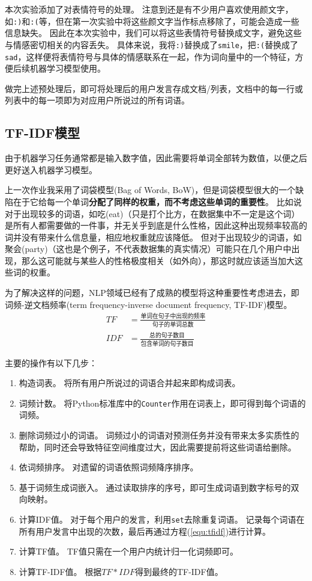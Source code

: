 \documentclass[logo,reportComp]{thesis}
\begin{document}
本次实验添加了对表情符号的处理。
注意到还是有不少用户喜欢使用颜文字，如\verb':)'和\verb':('等，但在第一次实验中将这些颜文字当作标点移除了，可能会造成一些信息缺失。
因此在本次实验中，我们可以将这些表情符号替换成文字，避免这些与情感密切相关的内容丢失。
具体来说，我将\verb':)'替换成了\verb'smile'，把\verb':('替换成了\verb'sad'，这样便将表情符号与具体的情感联系在一起，作为词向量中的一个特征，方便后续机器学习模型使用。

做完上述预处理后，即可将处理后的用户发言存成文档/列表，文档中的每一行或列表中的每一项即为对应用户所说过的所有词语。

\subsection{TF-IDF模型}
由于机器学习任务通常都是输入数字值，因此需要将单词全部转为数值，以便之后更好送入机器学习模型。

上一次作业我采用了词袋模型(Bag of Words, BoW)，但是词袋模型很大的一个缺陷在于它给每一个单词\textbf{分配了同样的权重，而不考虑这些单词的重要性}。
比如说对于出现较多的词语，如吃(eat)（只是打个比方，在数据集中不一定是这个词）是所有人都需要做的一件事，并无关乎到底是什么性格，因此这种出现频率较高的词并没有带来什么信息量，相应地权重就应该降低。
但对于出现较少的词语，如聚会(party)（这也是个例子，不代表数据集的真实情况）可能只在几个用户中出现，那么这可能就与某些人的性格极度相关（如外向），那这时就应该适当加大这些词的权重。

为了解决这样的问题，NLP领域已经有了成熟的模型将这种重要性考虑进去，即词频-逆文档频率(term frequency-inverse document frequency, TF-IDF)模型\cite{bib:tfidf}。
\begin{equation}
\label{equ:tfidf}
\begin{aligned}
TF &= \frac{\text{单词在句子中出现的频率}}{\text{句子的单词总数}}\\
IDF &= \frac{\text{总的句子数目}}{\text{包含单词的句子数目}}
\end{aligned}
\end{equation}

主要的操作有以下几步：
\begin{enumerate}
	\item 构造词表。
	将所有用户所说过的词语合并起来即构成词表。
	\item 词频计数。
	将Python标准库中的\verb'Counter'作用在词表上，即可得到每个词语的词频。
	\item 删除词频过小的词语。
	词频过小的词语对预测任务并没有带来太多实质性的帮助，同时还会导致特征空间维度过大，因此需要提前将这些词语给删除。
	\item 依词频排序。
	对遗留的词语依照词频降序排序。
	\item 基于词频生成词嵌入。
	通过读取排序的序号，即可生成词语到数字标号的双向映射。
	\item 计算IDF值。
	对于每个用户的发言，利用\verb'set'去除重复词语。
	记录每个词语在所有用户发言中出现的次数，最后再通过方程(\ref{equ:tfidf})进行计算。
	\item 计算TF值。
	TF值只需在一个用户内统计归一化词频即可。
	\item 计算TF-IDF值。
	根据$TF*IDF$得到最终的TF-IDF值。
\end{enumerate}
\end{document}
